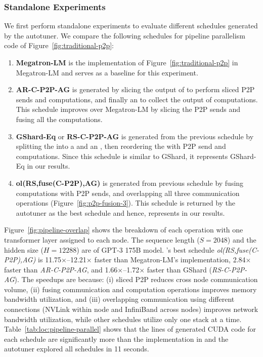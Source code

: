 \subsubsection{Standalone Experiments}
We first perform standalone experiments to evaluate different schedules generated by the autotuner.
We compare the following schedules for pipeline parallelism code of Figure~\ref{fig:traditional-p2p}:
\begin{enumerate}[leftmargin=*,topsep=2pt]
 \item \textbf{Megatron-LM} is the implementation of Figure~\ref{fig:traditional-p2p} in Megatron-LM and serves as a baseline for this experiment.
 \item \textbf{AR-C-P2P-AG} is generated by slicing the output of \allreduce to perform sliced P2P sends and computations, and finally an \allgather to collect the output of computations.
 This schedule improves over Megatron-LM by slicing the P2P sends and fusing all the computations.
 \item \textbf{GShard-Eq} or \textbf{RS-C-P2P-AG} is generated from the previous schedule by splitting the \allreduce into a \reducescatter and an \allgather, then reordering the \allgather with P2P send and computations.
 Since this schedule is similar to GShard, it represents GShard-Eq in our results.
  \item \textbf{ol(RS,fuse(C-P2P),AG)} is generated from previous schedule by fusing computations with P2P sends, and overlapping all three communication operations (Figure~\ref{fig:p2p-fusion-3}). This schedule is returned by the autotuner as the best schedule and hence, represents \tool in our results.
\end{enumerate}

Figure~\ref{fig:pipeline-overlap} shows the breakdown of each operation
with one transformer layer assigned to each node. The sequence length ($S=2048$) and the hidden
size ($H=12288$) are of GPT-3 175B model.
\tool's best schedule \textit{ol(RS,fuse(C-P2P),AG)} is 11.75$\times$--12.21$\times$ faster than Megatron-LM's implementation, 2.84$\times$ faster than \textit{AR-C-P2P-AG}, and 1.66$\times$--1.72$\times$ faster than GShard (\textit{RS-C-P2P-AG}). 
The speedups are because: 
(i) sliced P2P reduces cross node communication volume, 
(ii) fusing communication and computation operations improves memory bandwidth utilization, and
(iii) overlapping communication using different connections 
(NVLink within node and InfiniBand across nodes) improves network bandwidth utilization, while other schedules utilize only one stack at a time.
Table~\ref{tab:loc:pipeline-parallel} shows that the lines of generated CUDA code for each schedule are significantly more than the implementation in \tool and the autotuner explored all schedules in 11 seconds.

